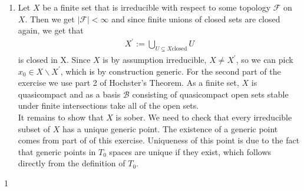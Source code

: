 \newcommand{\sheet}{3}




\maketitle{}

\begin{exercise}{1}
    \begin{enumerate}
        \item Let $X$ be a finite set that is irreducible with 
        respect to some topology $\mathcal{F}$ on $X$. Then we get
        $\mid \mathcal{F} \mid<\infty$ and since finite unions of
        closed sets are closed again, we get that
        \begin{align*}
            X^{\prime}:=\bigcup_{U \subsetneq X \text{closed}}{U}
        \end{align*}
        is closed in X. Since $X$ is by assumption irreducible,
        $X\neq X^{\prime}$, so we can pick $x_0\in X \backslash X^{\prime}$,
        which is by construction generic. For the second part of the exercise we use 
        part 2 of Hochster's Theorem. As a finite set, $X$ is 
        quasicompact and as a basis $\mathcal{B}$ consisting of quasicompact 
        open sets stable under finite intersections take all of the open sets. \\
        It remains to show that $X$ is sober. We need to check that every irreducible
        subset of $X$ has a unique generic point. The existence of a generic point comes
        from part of of this exercise. Uniqueness of this point is due to the fact
        that generic points in $T_0$ spaces are unique if they exist, which follows directly
        from the definition of $T_0$.
    \end{enumerate}
\end{exercise}{1}


